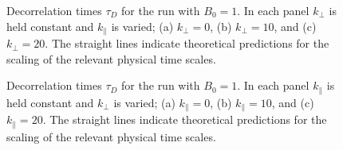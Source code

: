 \begin{figure}
  \centering


  \caption{Decorrelation times $\tau_D$ for the run with $B_0=1$. In each
    panel $k_\perp$ is held constant and $k_\parallel$ is varied; (a)
    $k_\perp=0$, (b) $k_\perp = 10$, and (c) $k_\perp = 20$. The
    straight lines indicate theoretical predictions for
    the scaling of the relevant physical time scales.}
  \label{fig5:B1_bvf_b_kperp}
\end{figure}

\begin{figure}
  \centering


  \caption{Decorrelation times $\tau_D$ for the run with $B_0=1$. In each
    panel $k_\parallel$ is held constant and $k_\perp$ is varied; (a)
    $k_\parallel = 0$, (b) $k_\parallel = 10$, and (c) $k_\parallel =
    20$. The straight lines indicate theoretical predictions for
    the scaling of the relevant physical time scales.}
  \label{fig5:B1_bvf_b_kpara}
\end{figure}

